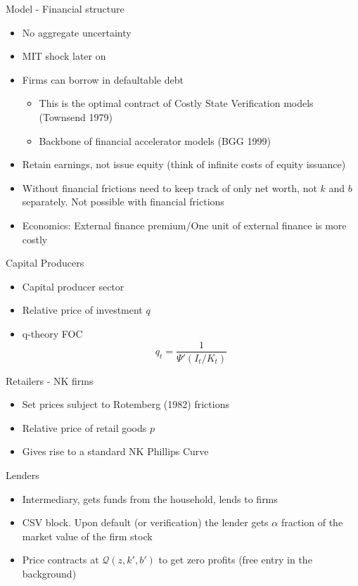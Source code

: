 \documentclass[english,xcolor=svgnames,aspectratio=169]{beamer}
\begin{document}
\begin{frame}{Model - Financial structure}
\begin{itemize}
\item No aggregate uncertainty
\item MIT shock later on
\item Firms can borrow in defaultable debt
\begin{itemize}
\item This is the optimal contract of Costly State Verification models (Townsend 1979)
\item Backbone of financial accelerator models (BGG 1999)
\end{itemize}
\item Retain earnings, not issue equity (think of infinite costs of equity issuance)
\item Without financial frictions need to keep track of only net worth, not $k$ and $b$ separately. Not possible with financial frictions
\item Economics: External finance premium/One unit of external finance is more costly
\end{itemize}
\end{frame}


\begin{frame}{Capital Producers}
\begin{itemize}
\item Capital producer sector
\item Relative price of investment $q$
\item q-theory FOC
\[q_t= \frac{1}{\Psi'(I_t/K_t)}\]
\end{itemize}
\end{frame}

\begin{frame}{Retailers - NK firms}
\begin{itemize}
\item Set prices subject to Rotemberg (1982) frictions
\item Relative price of retail goods $p$
\item Gives rise to a standard NK Phillips Curve
\end{itemize}
\end{frame}

\begin{frame}{Lenders}
\begin{itemize}
\item Intermediary, gets funds from the household, lends to firms
\item CSV block. Upon default (or verification) the lender gets $\alpha$ fraction of the market value of the firm stock
\item Price contracts at $\mathcal{Q}(z,k',b')$ to get zero profits (free entry in the background)
\end{itemize}
\end{frame}
\end{document}
